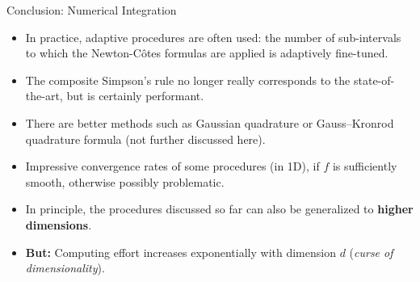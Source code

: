 \begin{vbframe}{Conclusion: Numerical Integration}

\begin{itemize}
  \item In practice, adaptive procedures are often used: the number of sub-intervals to which the Newton-C\^{o}tes formulas are applied is adaptively fine-tuned.
\item The composite Simpson's rule no longer really corresponds to the state-of-the-art, but is certainly
  performant.

  \item There are better methods such as Gaussian quadrature or Gauss–Kronrod quadrature formula
    (not further discussed here).

  \item Impressive convergence rates of some procedures (in 1D), if
    $f$ is sufficiently smooth, otherwise possibly problematic.

\item In principle, the procedures discussed so far can also be generalized to \textbf{higher dimensions}.
\item \textbf{But:} Computing effort increases exponentially with dimension $d$ (\textit{curse of dimensionality}).
\end{itemize}


\end{vbframe}


\endlecture

